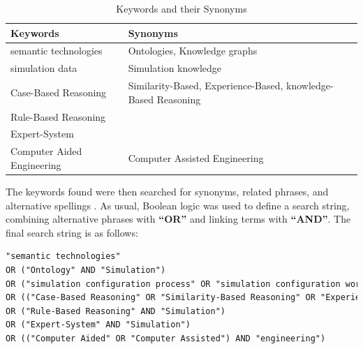            \begin{table}[h]
                \centering
        	    {
        	    \begin{tabular}{ | m{5.5cm} | m{9cm} | }
                    \hline
                    \rowcolor{teal!30} \textbf{Keywords} & \textbf{Synonyms} \\
                    
                    \hline
                    semantic technologies  & Ontologies, Knowledge graphs\\
                    
                    \hline
                    simulation data & Simulation knowledge\\
                    
                    \hline
                    Case-Based Reasoning  & Similarity-Based, Experience-Based, knowledge-Based Reasoning\\
                    
                    \hline
                    Rule-Based Reasoning  & \\
                    
                    \hline
                    Expert-System  & \\
                    
                    \hline
                    Computer Aided Engineering  & Computer Assisted Engineering\\
                    
                    \hline
                \end{tabular}}
                \caption{\label{tab:keyw-syno} Keywords and their Synonyms}
            \end{table}

            The keywords found were then searched for synonyms, related phrases, and alternative spellings \cite{budgen2006performing}. As usual, Boolean logic was used to define a search string, combining alternative phrases with \textbf{“OR”} and linking terms with \textbf{“AND”}. The final search string is as follows:\\

            \begin{lstlisting}[language=XML, caption=Generated Query, label={lst:gen-query}]
"semantic technologies" 
OR ("Ontology" AND "Simulation")
OR ("simulation configuration process" OR "simulation configuration workflow" OR "simulation configuration knowledge")
OR (("Case-Based Reasoning" OR "Similarity-Based Reasoning" OR "Experience-Based Reasoning" OR "knowledge-Based Reasoning") AND "Simulation")
OR ("Rule-Based Reasoning" AND "Simulation")
OR ("Expert-System" AND "Simulation")
OR (("Computer Aided" OR "Computer Assisted") AND "engineering")
            \end{lstlisting}


